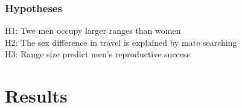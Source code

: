 \documentclass{beamer}
\begin{document}

\begin{frame}

\frametitle{Hypotheses}

H1: Twe men occupy larger ranges than women \\
\vspace{0.75cm}
H2: The sex difference in travel is explained by mate searching \\
\vspace{0.75cm}
H3: Range size predict men's reproductive success \\

\end{frame}


\section{Results}

\end{document}
